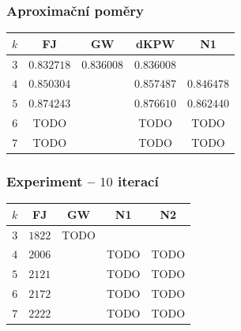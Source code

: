 \subsubsection*{Aproximační poměry}
\begin{center}
    \begin{tabular}{ c c c c c }
    $k$ & FJ         & GW                  & dKPW                & N1         \\
    \hline
    $3$ & $0.832718$ & $\mathbf{0.836008}$ & $\mathbf{0.836008}$ &            \\  
    $4$ & $0.850304$ &                     & $\mathbf{0.857487}$ & $0.846478$ \\
    $5$ & $0.874243$ &                     & $\mathbf{0.876610}$ & $0.862440$ \\
    $6$ & TODO       &                     & TODO                & TODO       \\
    $7$ & TODO       &                     & TODO                & TODO       \\
    \end{tabular}
\end{center}

\subsubsection*{Experiment -- $10$ iterací}
\begin{center}
    \begin{tabular}{ c c c c c }
    $k$ & FJ         & GW                  & N1                  & N2         \\
    \hline
    $3$ & $1822$     & TODO                &                     &            \\  
    $4$ & $2006$     &                     & TODO                & TODO       \\
    $5$ & $2121$     &                     & TODO                & TODO       \\
    $6$ & $2172$     &                     & TODO                & TODO       \\
    $7$ & $2222$     &                     & TODO                & TODO       \\
    \end{tabular}
\end{center}

